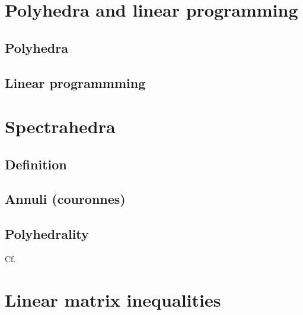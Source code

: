 \documentclass[a4paper,12pt]{article}
\begin{document}
\section{Polyhedra and linear programming}

\subsection{Polyhedra}
\subsection{Linear programmming}

\section{Spectrahedra}

\subsection{Definition}
\subsection{Annuli (couronnes)}
\subsection{Polyhedrality}
Cf. \cite{bhardwaj2015deciding}

\section{Linear matrix inequalities}


\printbibliography
\end{document}

